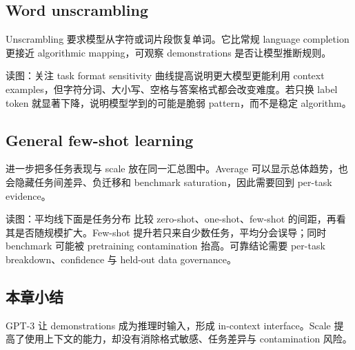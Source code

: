 \subsection{Word unscrambling}

Unscrambling 要求模型从字符或词片段恢复单词。它比常规 language completion 更接近 algorithmic mapping，可观察 demonstrations 是否让模型推断规则。


\begin{knowledgebox}{读图：关注 task format sensitivity}
曲线提高说明更大模型更能利用 context examples，但字符分词、大小写、空格与答案格式都会改变难度。若只换 label token 就显著下降，说明模型学到的可能是脆弱 pattern，而不是稳定 algorithm。
\end{knowledgebox}

\subsection{General few-shot learning}

进一步把多任务表现与 scale 放在同一汇总图中。Average 可以显示总体趋势，也会隐藏任务间差异、负迁移和 benchmark saturation，因此需要回到 per-task evidence。


\begin{knowledgebox}{读图：平均线下面是任务分布}
比较 zero-shot、one-shot、few-shot 的间距，再看其是否随规模扩大。Few-shot 提升若只来自少数任务，平均分会误导；同时 benchmark 可能被 pretraining contamination 抬高。可靠结论需要 per-task breakdown、confidence 与 held-out data governance。
\end{knowledgebox}


\subsection{本章小结}

GPT-3 让 demonstrations 成为推理时输入，形成 in-context interface。Scale 提高了使用上下文的能力，却没有消除格式敏感、任务差异与 contamination 风险。

